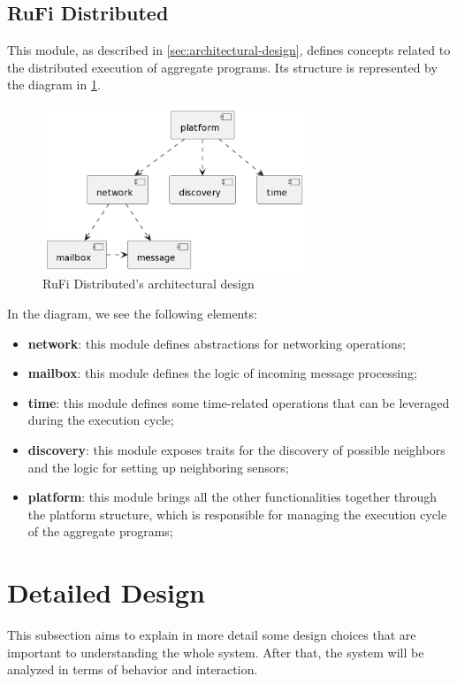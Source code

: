 \subsection{RuFi Distributed}
\label{subsec:rufi-distributed}
This module, as described in \ref{sec:architectural-design}, defines concepts related to the distributed execution of aggregate programs.
Its structure is represented by the diagram in \cref{fig:rufi-distributed-architecture}.

\begin{figure}[ht!]
    \centering
    \includegraphics[width=0.7\textwidth]{figures/diagrams/img/rufi-distributed-architecture.png}
    \caption{RuFi Distributed's architectural design}
    \label{fig:rufi-distributed-architecture}
\end{figure}

In the diagram, we see the following elements:

\begin{itemize}
    \item \textbf{network}: this module defines abstractions for networking operations;
    \item \textbf{mailbox}: this module defines the logic of incoming message processing;
    \item \textbf{time}: this module defines some time-related operations that can be leveraged during the execution cycle;
    \item \textbf{discovery}: this module exposes traits for the discovery of possible neighbors and the logic for setting up neighboring sensors;
    \item \textbf{platform}: this module brings all the other functionalities together through the platform structure, which is responsible for managing the execution cycle of the aggregate programs;
\end{itemize}

\section{Detailed Design}
\label{sec:detailed-design}
This subsection aims to explain in more detail some design choices that are important to understanding the whole system.
After that, the system will be analyzed in terms of behavior and interaction.

